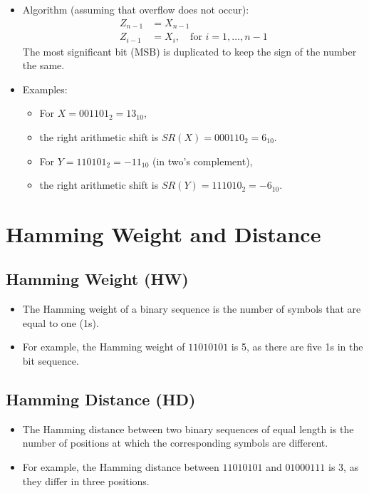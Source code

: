 \documentclass[12pt,openany]{book}
\begin{document}
	
	\begin{itemize}
		\item[] Algorithm (assuming that overflow does not occur):
		      \begin{align*}
		      	Z_{n-1} & = X_{n-1}                                   \\
		      	Z_{i-1} & = X_i, \quad \text{for } i = 1, \ldots, n-1 
		      \end{align*}
		      The most significant bit (MSB) is duplicated to keep the sign of the number the same.
		\item[] Examples:
		      \begin{itemize}
		      	\item[] For $X = 001101_2 = 13_{10}$,
				\item[] the right arithmetic shift is $SR(X) = 000110_2 = 6_{10}$.
		      	\item[] For $Y = 110101_2 = -11_{10}$ (in two's complement),
				\item[] the right arithmetic shift is $SR(Y) = 111010_2 = -6_{10}$.
		      \end{itemize}
	\end{itemize}
	
	
	\section{Hamming Weight and Distance}
	
	
	\subsection{Hamming Weight (HW)}
	\begin{itemize}
		\item[] The Hamming weight of a binary sequence is the number of symbols that are equal to one (1s).
		\item[] For example, the Hamming weight of \( 11010101 \) is 5, as there are five 1s in the bit sequence.
	\end{itemize}
	
	\subsection{Hamming Distance (HD)}
	\begin{itemize}
		\item[] The Hamming distance between two binary sequences of equal length is the number of positions at which the corresponding symbols are different.
		\item[] For example, the Hamming distance between \( 11010101 \) and \( 01000111 \) is 3, as they differ in three positions.
	\end{itemize}
	
\end{document}
